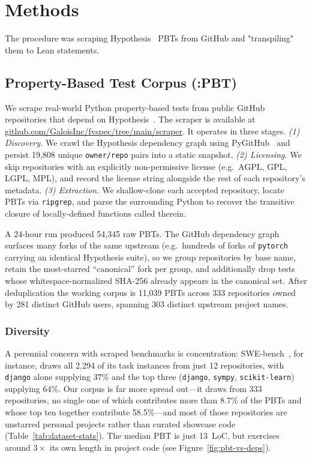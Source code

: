 \section{Methods}

The procedure was scraping Hypothesis~\cite{maciver2019hypothesis} PBTs from GitHub and "transpiling" them to Lean statements. 

\subsection{Property-Based Test Corpus (\FVSpec:PBT)}

We scrape real-world Python property-based tests from public GitHub repositories that depend on Hypothesis~\cite{maciver2019hypothesis}. The scraper is available at \href{https://github.com/GaloisInc/fvspec/tree/main/scraper}{github.com/GaloisInc/fvspec/tree/main/scraper}. It operates in three stages.
\emph{(1) Discovery.} We crawl the Hypothesis dependency graph using PyGitHub~\cite{pygithub} and persist 19{,}808 unique \texttt{owner/repo} pairs into a static snapshot.
\emph{(2) Licensing.} We skip repositories with an explicitly non-permissive license (e.g.\ AGPL, GPL, LGPL, MPL), and record the license string alongside the rest of each repository's metadata.
\emph{(3) Extraction.} We shallow-clone each accepted repository, locate PBTs via \texttt{ripgrep}, and parse the surrounding Python to recover the transitive closure of locally-defined functions called therein.

A 24-hour run produced 54{,}345 raw PBTs.
The GitHub dependency graph surfaces many forks of the same upstream (e.g.\ hundreds of forks of \texttt{pytorch} carrying an identical Hypothesis suite), so we group repositories by base name, retain the most-starred ``canonical'' fork per group, and additionally drop tests whose whitespace-normalized SHA-256 already appears in the canonical set.
After deduplication the working corpus is 11{,}039 PBTs across 333 repositories owned by 281 distinct GitHub users, spanning 303 distinct upstream project names.

\subsubsection{Diversity}
\label{sec:dataset-diversity}

A perennial concern with scraped benchmarks is concentration: SWE-bench~\cite{jimenez2024swebench}, for instance, draws all 2{,}294 of its task instances from just 12 repositories, with \texttt{django} alone supplying 37\% and the top three (\texttt{django}, \texttt{sympy}, \texttt{scikit-learn}) supplying 64\%. Our corpus is far more spread out---it draws from 333 repositories, no single one of which contributes more than 8.7\% of the PBTs and whose top ten together contribute 58.5\%---and most of those repositories are unstarred personal projects rather than curated showcase code (Table~\ref{tab:dataset-stats}). The median PBT is just 13~LoC, but exercises around $3\times$ its own length in project code (see Figure~\ref{fig:pbt-vs-deps}).


